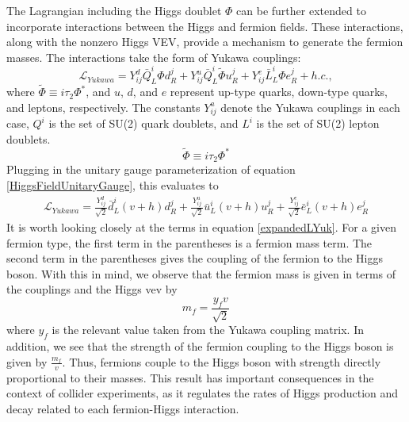The Lagrangian including the Higgs doublet $\Phi$ can be further extended to incorporate interactions between the Higgs and fermion fields. These interactions, along with the nonzero Higgs VEV, provide a mechanism to generate the fermion masses. The interactions take the 
form of Yukawa couplings:
\begin{equation}
    \mathcal{L}_{Yukawa} = Y_{ij}^{d}\bar{Q}^{i}_{L}\Phi d_{R}^{j} + Y_{ij}^{u}\bar{Q}^{i}_{L}\tilde{\Phi} u_{R}^{j} 
    + Y_{ij}^{e}\bar{L}^{i}_{L}\Phi e_{R}^{j} + h.c.,
    \label{LYukawa}
\end{equation}
where $\tilde{\Phi} \equiv i\tau_{2}\Phi^{*}$, and $u$, $d$, and $e$ represent up-type quarks, down-type quarks, and leptons, respectively. The constants $Y_{ij}^a$ denote the Yukawa couplings in each case, $Q^i$ is the set of SU(2) quark doublets, and $L^i$ is the set of SU(2) lepton doublets.
\begin{equation}
    \tilde{\Phi} \equiv i\tau_{2}\Phi^{*}
    \label{PhiDual}
\end{equation}
Plugging in the unitary gauge parameterization of equation \ref{HiggsFieldUnitaryGauge}, this evaluates to 
\begin{align}
    \mathcal{L}_{Yukawa} = \frac{Y_{ij}^{d}}{\sqrt{2}}\bar{d}_{L}^{i}(v + h)d_{R}^{j} 
    + \frac{Y_{ij}^{u}}{\sqrt{2}}\bar{u}_{L}^{i}(v+h)u_{R}^{j} + \frac{Y_{ij}^{e}}{\sqrt{2}}\bar{e}_{L}^{i}(v+h)e_{R}^{j}
    \label{expandedLYuk}
\end{align}
It is worth looking closely at the terms in equation \ref{expandedLYuk}. For a given fermion type, the first term in the parentheses
is a fermion mass term. The second term in the parentheses gives the coupling of the fermion to the Higgs boson. With this in mind, 
we observe that the fermion mass is given in terms of the couplings and the Higgs vev by 
\begin{equation}
    m_{f} = \frac{y_{f}v}{\sqrt{2}}
    \label{fermionMass}
\end{equation}
where $y_{f}$ is the relevant value taken from the Yukawa coupling matrix. In addition, we see that the strength of the fermion coupling
to the Higgs boson is given by $\frac{m_{f}}{v}$. Thus, fermions couple to the Higgs boson with strength directly proportional 
to their masses. This result has important consequences in the context of collider experiments, as it regulates the rates of
Higgs production and decay related to each fermion-Higgs interaction. 

